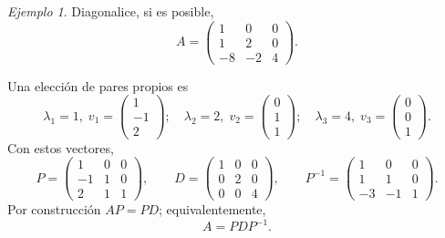 \documentclass[12pt]{article}
\theoremstyle{remark}
\newtheorem{Ejem}[definicion]{Ejemplo}
\begin{document}
\begin{Ejem}

Diagonalice, si es posible,
\[
A=\begin{pmatrix}1 & 0 & 0\\1 & 2 & 0\\-8 & -2 & 4\end{pmatrix}.
\]

\scriptsize
Una elección de pares propios es
\[
\lambda_1=1,\;v_1=\begin{pmatrix}1\\-1\\2\end{pmatrix};\quad \lambda_2=2,\;v_2=\begin{pmatrix}0\\1\\1\end{pmatrix};\quad \lambda_3=4,\;v_3=\begin{pmatrix}0\\0\\1\end{pmatrix}.
\]
Con estos vectores,
\[
P=\begin{pmatrix}1 & 0 & 0\\-1 & 1 & 0\\2 & 1 & 1\end{pmatrix},\qquad D=\begin{pmatrix}1 & 0 & 0\\0 & 2 & 0\\0 & 0 & 4\end{pmatrix},\qquad P^{-1}=\begin{pmatrix}1 & 0 & 0\\1 & 1 & 0\\-3 & -1 & 1\end{pmatrix}.
\]
Por construcción $AP=PD$; equivalentemente,
\[
\boxed{A=PDP^{-1}}.
\]

\end{Ejem}
\end{document}
